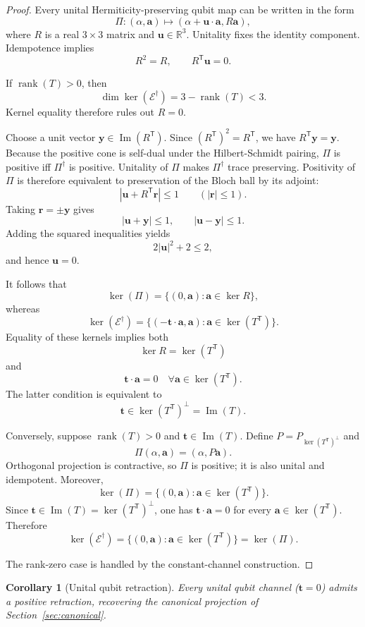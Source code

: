 \documentclass[
aps,pra,twocolumn,10pt,
superscriptaddress,longbibliography,floatfix
]{revtex4-2}
\DeclareMathOperator{\rank}{rank}
\DeclareMathOperator{\im}{Im}
\newtheorem{corollary}[theorem]{Corollary}
\begin{document}
\begin{proof}
Every unital Hermiticity-preserving qubit map can be written in the form
\[
\Pi:(\alpha,\mathbf a)\longmapsto(\alpha+\mathbf u\cdot\mathbf a,R\mathbf a),
\]
where $R$ is a real $3\times3$ matrix and $\mathbf u\in\mathbb R^3$. Unitality fixes the identity component. Idempotence implies
\[
R^2=R,\qquad R^{\mathsf T}\mathbf u=0.
\]

If $\rank(T)>0$, then
\[
\dim\ker(\mathcal E^\dagger)=3-\rank(T)<3.
\]
Kernel equality therefore rules out $R=0$.

Choose a unit vector $\mathbf y\in\im(R^{\mathsf T})$. Since $(R^{\mathsf T})^2=R^{\mathsf T}$, we have $R^{\mathsf T}\mathbf y=\mathbf y$. Because the positive cone is self-dual under the Hilbert-Schmidt pairing, $\Pi$ is positive iff $\Pi^\dagger$ is positive. Unitality of $\Pi$ makes $\Pi^\dagger$ trace preserving. Positivity of $\Pi$ is therefore equivalent to preservation of the Bloch ball by its adjoint:
\[
|\mathbf u+R^{\mathsf T}\mathbf r|\le1
\qquad(|\mathbf r|\le1).
\]
Taking $\mathbf r=\pm\mathbf y$ gives
\[
|\mathbf u+\mathbf y|\le1,
\qquad
|\mathbf u-\mathbf y|\le1.
\]
Adding the squared inequalities yields
\[
2|\mathbf u|^2+2\le2,
\]
and hence $\mathbf u=0$.

It follows that
\[
\ker(\Pi)
=
\{(0,\mathbf a):\mathbf a\in\ker R\},
\]
whereas
\[
\ker(\mathcal E^\dagger)
=
\{(-\mathbf t\cdot\mathbf a,\mathbf a):
\mathbf a\in\ker(T^{\mathsf T})\}.
\]
Equality of these kernels implies both
\[
\ker R=\ker(T^{\mathsf T})
\]
and
\[
\mathbf t\cdot\mathbf a=0
\quad
\forall\mathbf a\in\ker(T^{\mathsf T}).
\]
The latter condition is equivalent to
\[
\mathbf t\in
\ker(T^{\mathsf T})^\perp
=
\im(T).
\]

Conversely, suppose $\rank(T)>0$ and $\mathbf t\in\im(T)$. Define $P=P_{\ker(T^{\mathsf T})^\perp}$ and
\[
\Pi(\alpha,\mathbf a)=(\alpha,P\mathbf a).
\]
Orthogonal projection is contractive, so $\Pi$ is positive; it is also unital and idempotent. Moreover,
\[
\ker(\Pi)
=
\{(0,\mathbf a):\mathbf a\in\ker(T^{\mathsf T})\}.
\]
Since $\mathbf t\in\im(T)=\ker(T^{\mathsf T})^\perp$, one has $\mathbf t\cdot\mathbf a=0$ for every $\mathbf a\in\ker(T^{\mathsf T})$. Therefore
\[
\ker(\mathcal E^\dagger)
=
\{(0,\mathbf a):\mathbf a\in\ker(T^{\mathsf T})\}
=
\ker(\Pi).
\]

The rank-zero case is handled by the constant-channel construction.
\end{proof}

\begin{corollary}[Unital qubit retraction]
Every unital qubit channel ($\mathbf t=0$) admits a positive retraction, recovering the canonical projection of Section~\ref{sec:canonical}.
\end{corollary}
\end{document}
